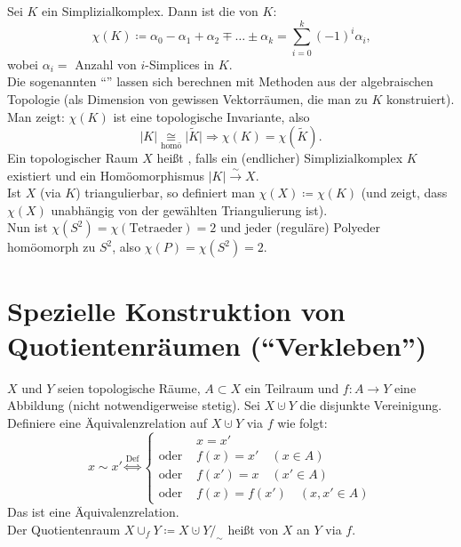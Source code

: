 \begin{definition}
  Sei \( K \) ein Simplizialkomplex. Dann ist die \label{def:eulercharakteristikSimplizialkomplex} von \( K \):
  \begin{equation*}
    \chi(K) \coloneqq \alpha_0-\alpha_1+\alpha_2 \mp \dots \pm \alpha_k = \sum_{i = 0}^k {(-1)}^i\alpha_i\text{,}
  \end{equation*}
  wobei \( \alpha_i = \) Anzahl von \( i \)-Simplices in \( K \). \\
  Die sogenannten ``''\label{def:bettiZahlen} lassen sich berechnen mit Methoden aus der algebraischen Topologie (als Dimension von gewissen Vektorräumen, die man zu \( K \) konstruiert). \\
  Man zeigt: \( \chi(K) \) ist eine topologische Invariante, also 
  \begin{equation*}
    \vert K \vert \underset{\text{homö}}{\cong} \vert \widetilde{K} \vert \Rightarrow \chi(K) = \chi(\widetilde{K})\text{.}
  \end{equation*}
  Ein topologischer Raum \( X \) heißt \label{def:triangulierbar}, falls ein (endlicher) Simplizialkomplex \( K \) existiert und ein Homöomorphismus \( \vert K \vert \overset{\sim}{\to} X \). \\
  Ist \( X \) (via \( K \)) triangulierbar, so definiert man \( \chi(X) \coloneqq \chi(K) \) (und zeigt, dass \( \chi(X) \) unabhängig von der gewählten Triangulierung ist). \\
  Nun ist \( \chi(S^2) = \chi(\text{Tetraeder}) = 2 \) und jeder (reguläre) Polyeder homöomorph zu \( S^2 \), also \( \chi(P) = \chi(S^2) = 2 \).
\end{definition}

\section{Spezielle Konstruktion von Quotientenräumen (``Verkleben'')}

\begin{definition}[Verklebung]
  \( X \) und \( Y \) seien topologische Räume, \( A \subset X \) ein Teilraum und \( f: A \to Y \) eine Abbildung (nicht notwendigerweise stetig). Sei \( X \cupdot Y \) die disjunkte Vereinigung. Definiere eine Äquivalenzrelation auf \( X \cupdot Y \) via \( f \) wie folgt:
  \begin{equation*}
    x \sim x' \overset{\text{Def}}{\Leftrightarrow} \begin{cases}
      &x = x' \\
      \text{oder } &f(x) = x' \quad (x \in A) \\
      \text{oder } &f(x') = x \quad (x' \in A) \\
      \text{oder } &f(x) = f(x') \quad (x, x' \in A)
    \end{cases}
  \end{equation*}
  Das ist eine Äquivalenzrelation. \\
  Der Quotientenraum \( X \cup_f Y \coloneqq X \cupdot Y /_\sim \) heißt \label{def:verklebung} von \( X \) an \( Y \) via \( f \).
\end{definition}

